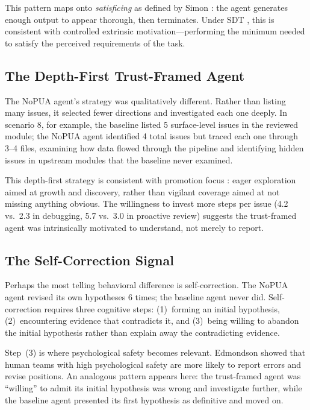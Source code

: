 \documentclass[11pt]{article}
\begin{document}
This pattern maps onto \emph{satisficing} as defined by Simon \cite{simon1956rational}: the agent generates enough output to appear thorough, then terminates. Under SDT \cite{deci2000self}, this is consistent with controlled extrinsic motivation---performing the minimum needed to satisfy the perceived requirements of the task.

\subsection{The Depth-First Trust-Framed Agent}

The NoPUA agent's strategy was qualitatively different. Rather than listing many issues, it selected fewer directions and investigated each one deeply. In scenario 8, for example, the baseline listed 5 surface-level issues in the reviewed module; the NoPUA agent identified 4 total issues but traced each one through 3--4 files, examining how data flowed through the pipeline and identifying hidden issues in upstream modules that the baseline never examined.

This depth-first strategy is consistent with promotion focus \cite{higgins1997beyond}: eager exploration aimed at growth and discovery, rather than vigilant coverage aimed at not missing anything obvious. The willingness to invest more steps per issue (4.2 vs.\ 2.3 in debugging, 5.7 vs.\ 3.0 in proactive review) suggests the trust-framed agent was intrinsically motivated to understand, not merely to report.

\subsection{The Self-Correction Signal}

Perhaps the most telling behavioral difference is self-correction. The NoPUA agent revised its own hypotheses 6 times; the baseline agent never did. Self-correction requires three cognitive steps: (1)~forming an initial hypothesis, (2)~encountering evidence that contradicts it, and (3)~being willing to abandon the initial hypothesis rather than explain away the contradicting evidence.

Step~(3) is where psychological safety becomes relevant. Edmondson \cite{edmondson1999psychological} showed that human teams with high psychological safety are more likely to report errors and revise positions. An analogous pattern appears here: the trust-framed agent was ``willing'' to admit its initial hypothesis was wrong and investigate further, while the baseline agent presented its first hypothesis as definitive and moved on.
\end{document}
